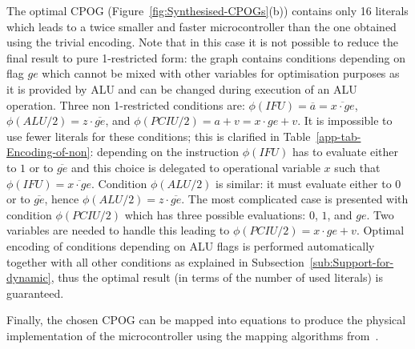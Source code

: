 The optimal CPOG (Figure~\ref{fig:Synthesised-CPOGs}(b)) contains
only 16 literals which leads to a twice smaller and faster microcontroller
than the one obtained using the trivial encoding. Note that in this
case it is not possible to reduce the final result to pure 1-restricted
form: the graph contains conditions depending on flag $ge$ which
cannot be mixed with other variables for optimisation purposes as
it is provided by ALU and can be changed during execution of an ALU
operation. Three non 1-restricted conditions are: $\phi(IFU)=\overline{a}=\overline{x\cdot ge}$,
$\phi(ALU/2)=z\cdot\overline{ge}$, and $\phi(PCIU/2)=a+v=x\cdot ge+v$.
It is impossible to use fewer literals for these conditions; this
is clarified in Table~\ref{app-tab-Encoding-of-non}: depending on
the instruction $\phi(IFU)$ has to evaluate either to $1$ or to
$\overline{ge}$ and this choice is delegated to operational variable
$x$ such that $\phi(IFU)=\overline{x\cdot ge}$. Condition $\phi(ALU/2)$
is similar: it must evaluate either to $0$ or to $\overline{ge}$,
hence $\phi(ALU/2)=z\cdot\overline{ge}$. The most complicated case
is presented with condition $\phi(PCIU/2)$ which has three possible
evaluations: $0$, $1$, and $ge$. Two variables are needed to handle
this leading to $\phi(PCIU/2)=x\cdot ge+v$. Optimal encoding of conditions
depending on ALU flags is performed automatically together with all
other conditions as explained in Subsection~\ref{sub:Support-for-dynamic},
thus the optimal result (in terms of the number of used literals)
is guaranteed.

Finally, the chosen CPOG can be mapped into equations to produce the
physical implementation of the microcontroller using the mapping algorithms
from~\cite{2009_mokhov_phd}\cite{2010_mokhov_ieee}.
